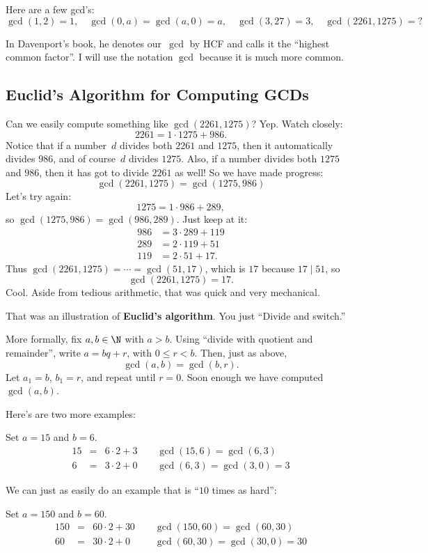\documentclass[11pt]{report}
\begin{document}
\noindent{}Here are a few gcd's:
$$\gcd(1,2)=1,\quad \gcd(0,a)=\gcd(a,0)=a, \quad\gcd(3,27)=3,
  \quad\gcd(2261,1275)=?$$


 In Davenport's book, he denotes our~$\gcd$ by HCF and calls it
the ``highest common factor''.    I will use the notation $\gcd$ because
it is much more common.

\subsection{Euclid's Algorithm for Computing GCDs}
Can we easily compute something like $\gcd(2261,1275)$?  Yep.
Watch closely:
$$2261 = 1\cdot 1275 + 986.$$
Notice that if a number~$d$ divides both $2261$ and $1275$, then it
automatically divides $986$, and of course~$d$ divides $1275$.  Also, if a number
divides both $1275$ and $986$, then it has got to divide $2261$ as well!
So we have made progress:
$$\gcd(2261,1275) = \gcd(1275,986)$$
Let's try again:
$$1275 = 1\cdot 986 + 289,$$
so $\gcd(1275,986)=\gcd(986,289)$.
Just keep at it:
\begin{align*}
  986 & =3\cdot 289 + 119 \\
  289 & =2\cdot 119 + 51  \\
  119 & =2\cdot 51 + 17.
\end{align*}
Thus $\gcd(2261,1275)=\cdots=\gcd(51,17)$, which is $17$
because $17\mid 51$, so
$$\gcd(2261,1275)=17.$$
Cool.  Aside from tedious arithmetic, that was
quick and very mechanical.

That was an illustration of {\bf Euclid's algorithm}.
You just ``Divide and switch.''

More formally, fix $a, b\in\N$ with $a>b$.
Using ``divide with quotient and remainder'',
write $a=bq+r$, with $0\leq r<b$.
Then, just as above,
$$\gcd(a,b) = \gcd(b,r).$$
Let $a_1=b$, $b_1=r$, and repeat until $r=0$.
Soon enough we have computed $\gcd(a,b)$.

Here's are two more examples:
\begin{example}
  Set $a=15$ and $b=6$.
  \begin{eqnarray*}
    15 &=& 6\cdot 2 + 3 \qquad\gcd(15,6)=\gcd(6,3)\\
    6 &=& 3\cdot 2 + 0 \qquad\gcd(6,3) =\gcd(3,0)=3
  \end{eqnarray*}
\end{example}
\noindent{}We can just as easily do an example that is ``$10$ times as hard'':
\begin{example}
  Set $a=150$ and $b=60$.
  \begin{eqnarray*}
    150 &=& 60\cdot 2 + 30 \qquad\gcd(150,60)=\gcd(60,30)\\
    60 &=& 30\cdot 2 + 0 \qquad\,\,\,\gcd(60,30) =\gcd(30,0)=30
  \end{eqnarray*}
\end{example}
\end{document}

